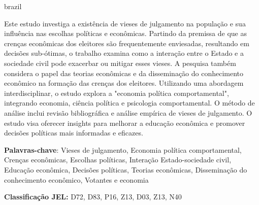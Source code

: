 \documentclass[
	article,
	12pt,
	oneside,
	a4paper,
	english,
	brazil,
	sumario=tradicional
]{abntex2}
\begin{document}
\renewcommand{\resumoname}{Resumo}
\begin{resumoumacoluna}
\begin{otherlanguage*}{brazil}
   \noindent 
      
   Este estudo investiga a existência de vieses de julgamento na população e sua influência nas escolhas políticas e econômicas. Partindo da premissa de que as crenças econômicas dos eleitores são frequentemente enviesadas, resultando em decisões sub-ótimas, o trabalho examina como a interação entre o Estado e a sociedade civil pode exacerbar ou mitigar esses vieses. A pesquisa também considera o papel das teorias econômicas e da disseminação do conhecimento econômico na formação das crenças dos eleitores. Utilizando uma abordagem interdisciplinar, o estudo explora a "economia política comportamental", integrando economia, ciência política e psicologia comportamental. O método de análise inclui revisão bibliográfica e análise empírica de vieses de julgamento. O estudo visa oferecer insights para melhorar a educação econômica e promover decisões políticas mais informadas e eficazes.

   \textbf{Palavras-chave}: Vieses de julgamento, Economia política comportamental, Crenças econômicas, Escolhas políticas, Interação Estado-sociedade civil, Educação econômica, Decisões políticas, Teorias econômicas, Disseminação do conhecimento econômico, Votantes e economia
   
   \textbf{Classificação JEL:} D72, D83, P16, Z13, D03, Z13, N40

 \end{otherlanguage*}  
\end{resumoumacoluna}

\newpage



\postextual
\renewcommand{\refname}{Referências}



%
\end{document}
